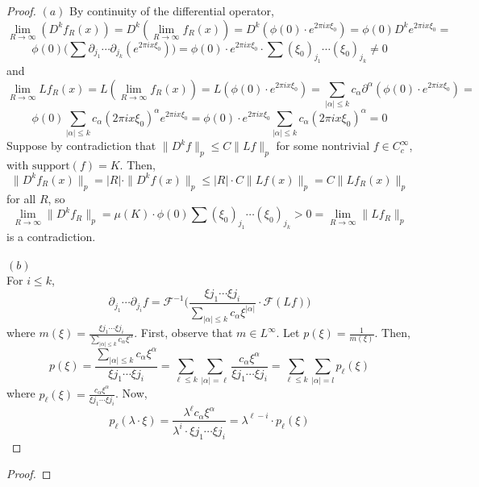 \documentclass[12pt]{article}
\newenvironment{exercise}[2][Exercise]{\begin{trivlist}
\item[\hskip \labelsep {\bfseries #1}\hskip \labelsep {\bfseries #2.}]}{\end{trivlist}}
\begin{document}
\begin{exercise}{2}
\end{exercise}

\begin{proof}
  $(a)$ By continuity of the differential operator,
  $$
    \lim_{R \rightarrow \infty} (D^k f_R(x)) =
    D^k(\lim_{R \rightarrow \infty} f_R(x)) =
    D^k(\phi(0) \cdot e^{2 \pi i x \xi_0}) =
    \phi(0)  D^k e^{2 \pi i x \xi_0} =
  $$
  $$
    \phi(0) \Big( \sum \partial_{j_1} \cdots \partial_{j_k}(e^{2 \pi i x \xi_0}) \Big) =
    \phi(0) \cdot e^{2 \pi i x \xi_0}  \cdot \sum (\xi_0)_{j_1} \cdots (\xi_0)_{j_k} \ne 0
  $$
  and
  $$
    \lim_{R \rightarrow \infty} L f_R(x) =
    L(\lim_{R \rightarrow \infty} f_R(x)) =
    L(\phi(0) \cdot e^{2 \pi i x \xi_0}) =
    \sum_{|\alpha| \le k}  c_\alpha \partial^\alpha (\phi(0) \cdot e^{2 \pi i x \xi_0}) =
  $$
  $$
    \phi(0) \sum_{|\alpha| \le k}  c_\alpha (2 \pi i x \xi_0)^\alpha e^{2 \pi i x \xi_0}  =
    \phi(0) \cdot e^{2 \pi i x \xi_0} \sum_{|\alpha| \le k}  c_\alpha (2 \pi i x \xi_0)^\alpha =
    0
  $$
  Suppose by contradiction that $\|D^k f\|_p \le C  \|Lf\|_p$ for some nontrivial $f \in C^\infty_c$, with $\text{support}(f) = K$. Then,
  $$
    \|D^k f_R(x)\|_p =
    |R| \cdot \|D^k f(x)\|_p \le
    |R| \cdot C \|Lf(x)\|_p =
    C \|Lf_R(x)\|_p
  $$
  for all $R$, so
  $$
    \lim_{R \rightarrow \infty} \|D^k f_R\|_p =
    \mu(K) \cdot \phi(0) \sum (\xi_0)_{j_1} \cdots (\xi_0)_{j_k} >
    0 =
    \lim_{R \rightarrow \infty} \|Lf_R\|_p
  $$
  is a contradiction.\\\\
  $(b)$\\
  For  $i \le k$,
  $$
    \partial_{j_1} \cdots \partial_{j_i} f =
    \mathcal{F}^{-1}\Big( \dfrac{\xi{j_1} \cdots \xi{j_i}}{\sum_{|\alpha| \le k} c_\alpha \xi^{|\alpha|}} \cdot \mathcal{F}(Lf) \Big)
  $$
  where $m(\xi) = \frac{\xi{j_1} \cdots \xi{j_i}}{\sum_{|\alpha| \le k}c_\alpha \xi^{\alpha}}$. First, observe that $m \in L^\infty$. Let $p(\xi) = \frac{1}{m(\xi)}$. Then,
  $$
    p(\xi) =
    \frac{\sum_{|\alpha| \le k}c_\alpha \xi^{\alpha}}{\xi{j_1} \cdots \xi{j_i}} =
    \sum_{\ell \le k} \sum_{|\alpha| = \ell} \frac{c_\alpha \xi^{\alpha}}{\xi{j_1} \cdots \xi{j_i}} =
    \sum_{\ell \le k} \sum_{|\alpha| = l} p_\ell(\xi)
  $$
  where $p_\ell(\xi) = \frac{c_\alpha \xi^{\alpha}}{\xi{j_1} \cdots \xi{j_i}}$.
  Now,
  $$
    p_\ell(\lambda \cdot \xi) =
    \frac{\lambda^\ell c_\alpha \xi^{\alpha}}{\lambda^i \cdot \xi{j_1} \cdots \xi{j_i}} =
    \lambda^{\ell - i} \cdot p_\ell(\xi)
  $$
\end{proof}

\begin{exercise}{3}
\end{exercise}

\begin{proof}

\end{proof}
\end{document}
